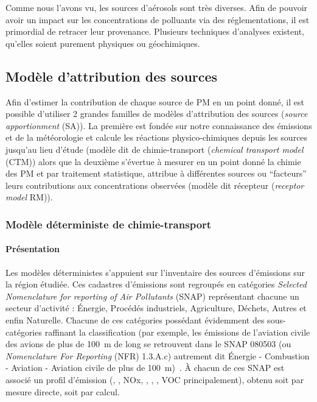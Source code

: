 Comme nous l'avons vu, les sources d'aérosols sont très diverses.
Afin de pouvoir avoir un impact sur les concentrations de polluants via des
réglementations, il est primordial de
retracer leur provenance. Plusieurs techniques d'analyses existent, qu'elles soient purement
physiques ou géochimiques.

\subsection{Modèle d'attribution des sources}%
\label{sec:source_apportionment_model}

Afin d'estimer la contribution de chaque source de PM en un point donné, il est possible
d'utiliser 2 grandes familles de modèles d'attribution des sources (\textit{source
apportionment} (SA)). La première est fondée sur notre connaissance des
émissions et de la météorologie et calcule les réactions physico-chimiques depuis les
sources jusqu'au lieu d'étude (modèle dit de chimie-transport (\textit{chemical transport
model} (CTM)) alors que la deuxième s'évertue à mesurer en un point donné
la chimie des PM et par traitement statistique, attribue à différentes sources ou
``facteurs'' leurs contributions aux concentrations observées (modèle dit récepteur
(\textit{receptor model} RM)).

\subsubsection{Modèle déterministe de chimie-transport}%
\label{ssub:modele_deterministe_de_chimietransport}

\paragraph{Présentation}%
\label{par:presentation}

Les modèles déterministes s'appuient sur l'inventaire des sources d'émissions sur la
région étudiée. Ces cadastres d'émissions sont regroupés en catégories \textit{Selected
Nomenclature for reporting of Air Pollutants} (SNAP) représentant chacune un secteur
d'activité : Énergie, Procédés industriels, Agriculture, Déchets, Autres et enfin
Naturelle.
Chacune de ces catégories possédant évidemment des sous-catégories raffinant la
classification (par exemple, les émissions de l'aviation civile des avions de plus de \SI{100}{m} de
long se retrouvent dans le SNAP 080503 (ou \textit{Nomenclature For Reporting} (NFR)
1.3.A.c) autrement dit Énergie - Combustion - Aviation - Aviation civile de plus de
\SI{100}{m})~\autocite{europeanenvironmentagencyEMEP2019}.
À chacun de ces SNAP est associé un profil d'émission (, , NOx, , \PMdix, \PMdc,
VOC principalement), obtenu soit par mesure directe, soit par calcul.

